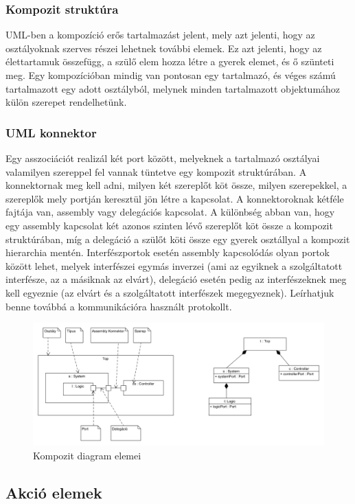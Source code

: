 \documentclass[a4paper,12pt]{report}
\begin{document}
\subsubsection{Kompozit struktúra}
UML-ben a kompozíció erős tartalmazást jelent, mely azt jelenti, hogy az osztályoknak szerves részei lehetnek további elemek. Ez azt jelenti, hogy az élettartamuk összefügg, a szülő elem hozza létre a gyerek elemet, és ő szünteti meg. Egy kompozícióban mindig van pontosan egy tartalmazó, és véges számú tartalmazott egy adott osztályból, melynek minden tartalmazott objektumához külön szerepet rendelhetünk.
\subsubsection{UML konnektor}
Egy asszociációt realizál két port között, melyeknek a tartalmazó osztályai valamilyen szereppel fel vannak tüntetve egy kompozit struktúrában. A konnektornak meg kell adni, milyen két szereplőt köt össze, milyen szerepekkel, a szereplők mely portján keresztül jön létre a kapcsolat. A konnektoroknak kétféle fajtája van, assembly vagy delegációs kapcsolat. A különbség abban van, hogy egy assembly kapcsolat két azonos szinten lévő szereplőt köt össze a kompozit struktúrában, míg a delegáció a szülőt köti össze egy gyerek osztállyal a kompozit hierarchia mentén. Interfészportok esetén assembly kapcsolódás olyan portok között lehet, melyek interfészei egymás inverzei (ami az egyiknek a szolgáltatott interfésze, az a másiknak az elvárt), delegáció esetén pedig az interfészeknek meg kell egyeznie (az elvárt és a szolgáltatott interfészek megegyeznek). Leírhatjuk benne továbbá a kommunikációra használt protokollt. \\

\begin{figure}[H]
\includegraphics[scale=0.8]{composit_stuct.png}
\caption{Kompozit diagram elemei}
\end{figure}

\subsection{Akció elemek}
\end{document}
